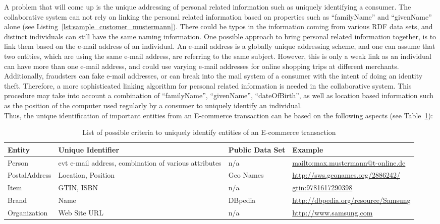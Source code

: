 A problem that will come up is the unique addressing of personal related information such as uniquely identifying a consumer. The collaborative system can not rely on linking the personal related information based on properties such as ``familyName'' and ``givenName'' alone (see Listing~\ref{lst:sample_customer_mustermann}). There could be typos in the information coming from various \gls{RDF} data sets, and distinct individuals can still have the same naming information. One possible approach to bring personal related information together, is to link them based on the e-mail address of an individual. An e-mail address is a globally unique addressing scheme, and one can assume that two entities, which are using the same e-mail address, are referring to the same subject. However, this is only a weak link as an individual can have more than one e-mail address, and could use varying e-mail addresses for online shopping trips at different merchants. Additionally, fraudsters can fake e-mail addresses, or can break into the mail system of a consumer with the intent of doing an identity theft. Therefore, a more sophisticated linking algorithm for personal related information is needed in the collaborative system. This procedure may take into account a combination of ``familyName'', ``givenName'', ``dateOfBirth'', as well as location based information such as the position of the computer used regularly by a consumer to uniquely identify an individual. \\

Thus, the unique identification of important entities from an \gls{E-commerce} transaction can be based on the following aspects (see Table~\ref{tab:mapping_information}): \@

\begin{table}[H]
\centering
\begin{tabular}{lp{3.3cm}lp{4cm}}
\hline
\textbf{Entity} & \textbf{Unique Identifier} & \textbf{Public Data Set} & \textbf{Example} \\
\hline
Person & \gls{evt} e-mail address, combination of various attributes & n/a & \url{mailto:max.mustermann@t-online.de} \\
\hline
PostalAddress & Location, Position & Geo Names & \url{http://sws.geonames.org/2886242/} \\
\hline
Item & \gls{GTIN}, \gls{ISBN} & n/a & \url{gtin:9781617290398} \\
\hline
Brand & Name & DBpedia & \url{http://dbpedia.org/resource/Samsung} \\
\hline
Organization & Web Site \gls{URL} & n/a & \url{http://www.samsung.com} \\
\hline
\end{tabular}
\caption{List of possible criteria to uniquely identify entities of an \gls{E-commerce} transaction}
\label{tab:mapping_information}
\end{table}

